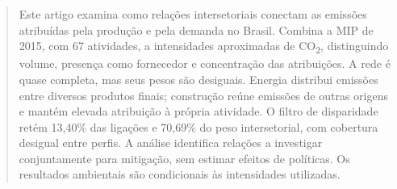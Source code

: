 \begin{abstract}
Este artigo examina como relações intersetoriais conectam as emissões atribuídas pela produção e pela demanda no Brasil. Combina a MIP de 2015, com 67 atividades, a intensidades aproximadas de CO\textsubscript{2}, distinguindo volume, presença como fornecedor e concentração das atribuições. A rede é quase completa, mas seus pesos são desiguais. Energia distribui emissões entre diversos produtos finais; construção reúne emissões de outras origens e mantém elevada atribuição à própria atividade. O filtro de disparidade retém 13,40\% das ligações e 70,69\% do peso intersetorial, com cobertura desigual entre perfis. A análise identifica relações a investigar conjuntamente para mitigação, sem estimar efeitos de políticas. Os resultados ambientais são condicionais às intensidades utilizadas.
\end{abstract}
